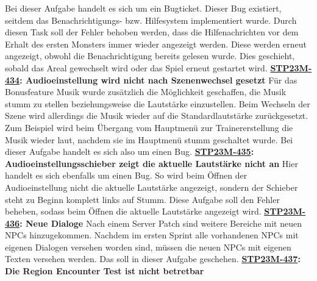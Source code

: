 Bei dieser Aufgabe handelt es sich um ein Bugticket. Dieser Bug existiert, seitdem das Benachrichtigungs- bzw. Hilfesystem implementiert wurde. Durch diesen Task soll der Fehler behoben werden, dass die Hilfenachrichten vor dem Erhalt des ersten Monsters immer wieder angezeigt werden. Diese werden erneut angezeigt, obwohl die Benachrichtigung bereits gelesen wurde. Dies geschieht, sobald das Areal gewechselt wird oder das Spiel erneut gestartet wird.
\newline
\newline
\textbf{\hyperlink{T434}{\hypertarget{S434}{STP23M-434}}: Audioeinstellung wird nicht nach Szenenwechsel gesetzt}
\newline
\newline
Für das Bonusfeature Musik wurde zusätzlich die Möglichkeit geschaffen, die Musik stumm zu stellen beziehungsweise die Lautstärke einzustellen. Beim Wechseln der Szene wird allerdings die Musik wieder auf die Standardlautstärke zurückgesetzt. Zum Beispiel wird beim Übergang vom Hauptmenü zur Trainererstellung die Musik wieder laut, nachdem sie im Hauptmenü stumm geschaltet wurde. Bei dieser Aufgabe handelt es sich also um einen Bug.
\newline
\newline
\textbf{\hyperlink{T435}{\hypertarget{S435}{STP23M-435}}: Audioeinstellungsschieber zeigt die aktuelle Lautstärke nicht an}
\newline
\newline
Hier handelt es sich ebenfalls um einen Bug. So wird beim Öffnen der Audioeinstellung nicht die aktuelle Lautstärke angezeigt, sondern der Schieber steht zu Beginn komplett links auf Stumm. Diese Aufgabe soll den Fehler beheben, sodass beim Öffnen die aktuelle Lautstärke angezeigt wird.
\newline
\newline
\textbf{\hyperlink{T436}{\hypertarget{S436}{STP23M-436}}: Neue Dialoge}
\newline
\newline
Nach einem Server Patch sind weitere Bereiche mit neuen NPCs hinzugekommen. Nachdem im ersten Sprint alle vorhandenen NPCs mit eigenen Dialogen versehen worden sind, müssen die neuen NPCs mit eigenen Texten versehen werden. Das soll in dieser Aufgabe geschehen.
\newline
\newline
\textbf{\hyperlink{T437}{\hypertarget{S437}{STP23M-437}}: Die Region Encounter Test ist nicht betretbar}
\newline
\newline
